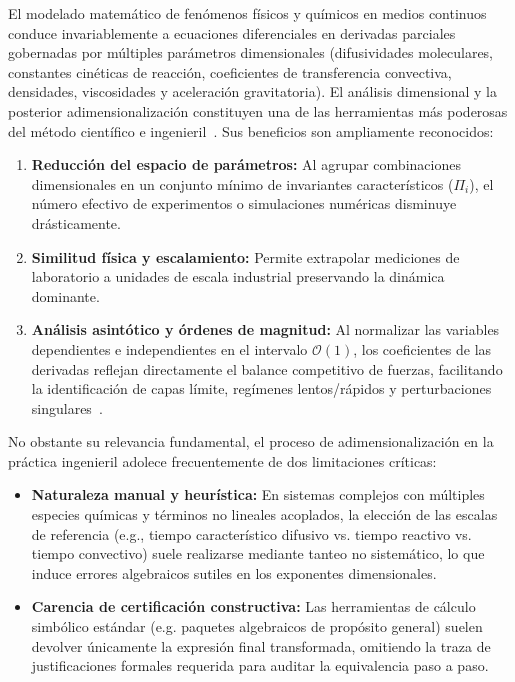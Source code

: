 \documentclass[11pt,a4paper]{article}
\theoremstyle{definition}
\theoremstyle{plain}
\theoremstyle{remark}
\begin{document}
El modelado matemático de fenómenos físicos y químicos en medios continuos conduce invariablemente a ecuaciones diferenciales en derivadas parciales gobernadas por múltiples parámetros dimensionales (difusividades moleculares, constantes cinéticas de reacción, coeficientes de transferencia convectiva, densidades, viscosidades y aceleración gravitatoria). El análisis dimensional y la posterior adimensionalización constituyen una de las herramientas más poderosas del método científico e ingenieril~\cite{barenblatt1996,buckingham1914}. Sus beneficios son ampliamente reconocidos:
\begin{enumerate}
    \item \textbf{Reducción del espacio de parámetros:} Al agrupar combinaciones dimensionales en un conjunto mínimo de invariantes característicos ($\Pi_i$), el número efectivo de experimentos o simulaciones numéricas disminuye drásticamente.
    \item \textbf{Similitud física y escalamiento:} Permite extrapolar mediciones de laboratorio a unidades de escala industrial preservando la dinámica dominante.
    \item \textbf{Análisis asintótico y órdenes de magnitud:} Al normalizar las variables dependientes e independientes en el intervalo $\mathcal{O}(1)$, los coeficientes de las derivadas reflejan directamente el balance competitivo de fuerzas, facilitando la identificación de capas límite, regímenes lentos/rápidos y perturbaciones singulares~\cite{krantz2007}.
\end{enumerate}

No obstante su relevancia fundamental, el proceso de adimensionalización en la práctica ingenieril adolece frecuentemente de dos limitaciones críticas:
\begin{itemize}
    \item \textbf{Naturaleza manual y heurística:} En sistemas complejos con múltiples especies químicas y términos no lineales acoplados, la elección de las escalas de referencia (e.g., tiempo característico difusivo vs. tiempo reactivo vs. tiempo convectivo) suele realizarse mediante tanteo no sistemático, lo que induce errores algebraicos sutiles en los exponentes dimensionales.
    \item \textbf{Carencia de certificación constructiva:} Las herramientas de cálculo simbólico estándar (e.g. paquetes algebraicos de propósito general) suelen devolver únicamente la expresión final transformada, omitiendo la traza de justificaciones formales requerida para auditar la equivalencia paso a paso.
\end{itemize}
\end{document}

